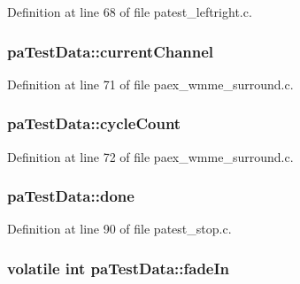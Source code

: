Definition at line 68 of file patest\+\_\+leftright.\+c.

\subsubsection[{\texorpdfstring{current\+Channel}{currentChannel}}]{ pa\+Test\+Data\+::current\+Channel}\hypertarget{structpa_test_data_a392da0b67204d30cb209843f7aaff2db}{}\label{structpa_test_data_a392da0b67204d30cb209843f7aaff2db}


Definition at line 71 of file paex\+\_\+wmme\+\_\+surround.\+c.

\subsubsection[{\texorpdfstring{cycle\+Count}{cycleCount}}]{ pa\+Test\+Data\+::cycle\+Count}\hypertarget{structpa_test_data_ae2eebe1873d8cc4a138842a57f6d112d}{}\label{structpa_test_data_ae2eebe1873d8cc4a138842a57f6d112d}


Definition at line 72 of file paex\+\_\+wmme\+\_\+surround.\+c.

\subsubsection[{\texorpdfstring{done}{done}}]{ pa\+Test\+Data\+::done}\hypertarget{structpa_test_data_aa180ddd97c27eec07a931b4d74cac3a0}{}\label{structpa_test_data_aa180ddd97c27eec07a931b4d74cac3a0}


Definition at line 90 of file patest\+\_\+stop.\+c.

\subsubsection[{\texorpdfstring{fade\+In}{fadeIn}}]{\setlength{\rightskip}{0pt plus 5cm}volatile {\bf int} pa\+Test\+Data\+::fade\+In}\hypertarget{structpa_test_data_ac02b04d549c80e075c26d0001ef91ef7}{}\label{structpa_test_data_ac02b04d549c80e075c26d0001ef91ef7}


